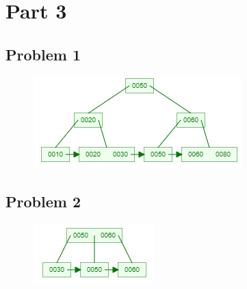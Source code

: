 \documentclass[12pt]{article}
\begin{document}
\section*{Part 3}

\subsection*{Problem 1}

\begin{figure}[!ht]
    \begin{center}
        \includegraphics{problem3-1.png}
    \end{center}
\end{figure}

\subsection*{Problem 2}

\begin{figure}[!ht]
    \begin{center}
        \includegraphics{problem3-2.png}
    \end{center}
\end{figure}
\end{document}
